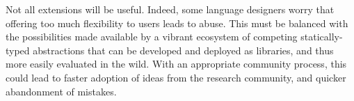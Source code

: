 \documentclass[9pt,preprint]{sigplanconf}
\begin{document}
%
% 
%
%

Not all extensions will be useful. Indeed, some language designers worry that offering too much flexibility to users leads to abuse. This must be balanced with the possibilities made available by a vibrant ecosystem of competing statically-typed abstractions that can be developed and deployed as libraries, and thus more easily evaluated in the wild. With an appropriate community process, this could lead to faster adoption of ideas from the research community, and quicker abandonment of mistakes. %
% 





\end{document}
